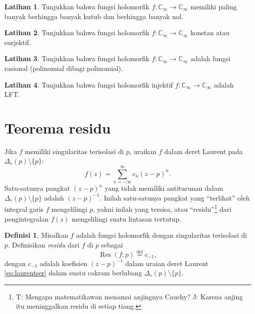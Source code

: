 \documentclass[12pt,openany]{book}
\newcommand{\C}{{\mathbb{C}}}
\newcommand{\myindex}[1]{#1\index{#1}}
\newcommand{\myquote}[1]{``#1''}
\theoremstyle{plain}
\theoremstyle{remark}
\theoremstyle{definition}
\newtheorem{defn}[thm]{Definisi}
\newenvironment{exbox}{%
    \def\FrameCommand{\vrule width 1pt \relax\hspace{10pt}}%
    \MakeFramed{\advance\hsize-\width\FrameRestore}%
}{%
    \endMakeFramed
}
\theoremstyle{exercise}
\newtheorem{exercise}{Latihan}[section]
\theoremstyle{example}
\begin{document}
\begin{exbox}
\begin{exercise}
Tunjukkan bahwa fungsi holomorfik $f \colon \C_\infty \to \C_\infty$ memiliki
paling banyak berhingga banyak kutub dan berhingga banyak nol.
\end{exercise}

\begin{exercise}
Tunjukkan bahwa fungsi holomorfik $f \colon \C_\infty \to \C_\infty$
konstan atau surjektif.
\end{exercise}

\begin{exercise}
Tunjukkan bahwa fungsi holomorfik $f \colon \C_\infty \to \C_\infty$ adalah
fungsi rasional (polinomial dibagi polinomial).
\end{exercise}

\begin{exercise}
Tunjukkan bahwa fungsi holomorfik injektif $f \colon \C_\infty \to \C_\infty$ adalah
LFT\@.
\end{exercise}
\end{exbox}


\section{Teorema residu}

Jika $f$ memiliki singularitas terisolasi di $p$,
uraikan
$f$ dalam deret Laurent pada $\Delta_r(p) \setminus \{ p \}$:
\begin{equation} \label{eq:laurentser}
f(z) = \sum_{n=-\infty}^\infty c_n {(z-p)}^n .
\end{equation}
Satu-satunya pangkat ${(z-p)}^n$ yang tidak memiliki antiturunan dalam
$\Delta_r(p) \setminus \{ p \}$ adalah ${(z-p)}^{-1}$. Inilah satu-satunya pangkat
yang \myquote{terlihat} oleh integral garis $f$ mengelilingi $p$, yakni inilah
yang tersisa, atau \myquote{residu}\footnote{%
T\@: Mengapa matematikawan menamai anjingnya Cauchy?
J\@: Karena anjing itu meninggalkan residu di setiap tiang.}
dari pengintegralan $f(z)$ mengelilingi suatu lintasan tertutup.

\begin{defn}
Misalkan $f$ adalah fungsi holomorfik
dengan singularitas terisolasi di $p$.
Definisikan \emph{\myindex{residu}} dari $f$ di $p$ sebagai
%
\begin{equation*}
\operatorname{Res}(f;p)
\overset{\text{def}}{=}
c_{-1} ,
\end{equation*}
dengan $c_{-1}$ adalah koefisien ${(z-p)}^{-1}$ dalam uraian deret Laurent
\eqref{eq:laurentser} dalam suatu cakram berlubang $\Delta_r(p) \setminus \{ p \}$.
\end{defn}
\end{document}
